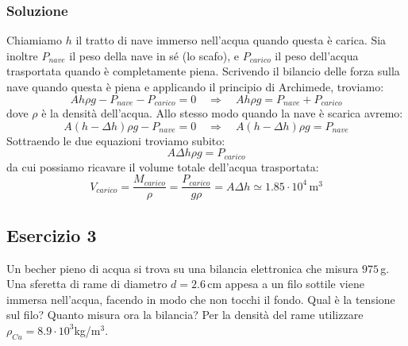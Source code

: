 \documentclass[12pt,a4paper]{book}
\begin{document}
\subsubsection*{Soluzione}
Chiamiamo $h$ il tratto di nave immerso nell'acqua quando questa è carica. Sia inoltre $P_{nave}$ il peso della nave in sé (lo scafo), e $P_{carico}$ il peso dell'acqua trasportata quando è completamente piena. Scrivendo il bilancio delle forza sulla nave quando questa è piena e applicando il principio di Archimede, troviamo:
\begin{equation*}
Ah\rho g - P_{nave} - P_{carico}=0 \quad \Rightarrow \quad Ah\rho g = P_{nave} + P_{carico}
\end{equation*}
dove $\rho$ è la densità dell'acqua. Allo stesso modo quando la nave è scarica avremo:
\begin{equation*}
A(h-\Delta h)\rho g - P_{nave}=0 \quad \Rightarrow \quad A(h-\Delta h)\rho g = P_{nave} 
\end{equation*}
Sottraendo le due equazioni troviamo subito:
\begin{equation*}
A\Delta h\rho g = P_{carico} 
\end{equation*}
da cui possiamo ricavare il volume totale dell'acqua trasportata:
\begin{equation*}
V_{carico}=\frac{M_{carico} }{\rho}=\frac{P_{carico} }{g\rho}=A \Delta h \simeq 1.85 \cdot 10^4 \, \text{m}^3
\end{equation*}

\subsection*{Esercizio 3}
Un becher pieno di acqua si trova su una bilancia elettronica
che misura $975\,$g. Una sferetta di rame di diametro $d=2.6\,$cm appesa a un filo sottile viene immersa nell'acqua, facendo in modo che non tocchi il fondo. Qual è la tensione sul filo? Quanto misura ora la bilancia? Per la densità del rame utilizzare $\rho_{Cu}=8.9 \cdot 10^3$kg/m$^3$. 
\end{document}
